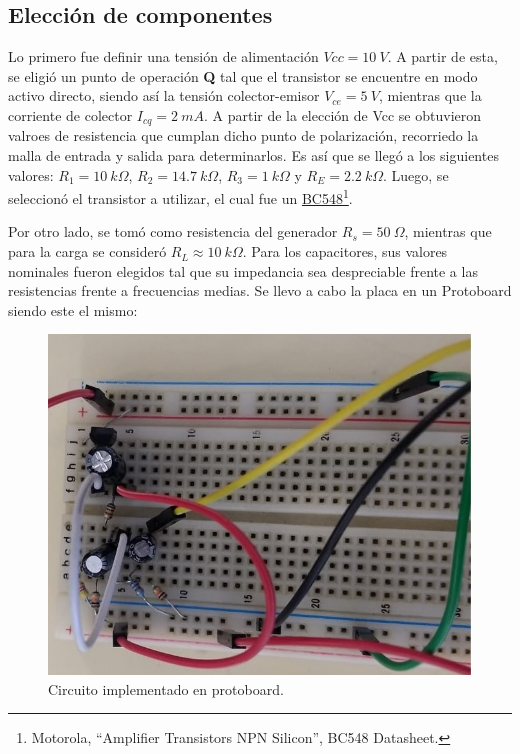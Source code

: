 \subsection{Elección de componentes}

Lo primero fue definir una tensión de alimentación $Vcc = 10 \ V$. A partir de esta, se eligió un punto de operación \textbf{Q} tal que el transistor se encuentre en modo activo directo, siendo así la tensión colector-emisor $V_{ce} = 5 \ V$, mientras que la corriente de colector $I_{cq} = 2 \ mA$.  A partir de la elección de Vcc se obtuvieron valroes de resistencia que cumplan dicho punto de polarización, recorriedo la malla de entrada y salida para determinarlos. Es así que se llegó a los siguientes valores: $R_1 = 10 \ k\Omega$, $R_2 = 14.7 \ k\Omega$, $R_3 = 1 \ k\Omega$ y $R_E = 2.2 \ k\Omega$. Luego, se seleccionó el transistor a utilizar, el cual fue un \href{https://www.futurlec.com/Transistors/BC548.shtml}{BC548}\footnote{Motorola, ``Amplifier Transistors NPN Silicon'', BC548 Datasheet.}.

Por otro lado, se tomó como resistencia del generador $R_s = 50 \ \Omega$, mientras que para la carga se consideró $R_L \approx 10 \ k\Omega$. Para los capacitores, sus valores nominales fueron elegidos tal que su impedancia sea despreciable frente a las resistencias frente a frecuencias medias.
Se llevo a cabo la placa en un Protoboard siendo este el mismo:
\begin{figure}[H]
\centering
\includegraphics[scale=0.6]{imagenes/proto.jpeg} 
\caption{Circuito implementado en protoboard.}
\end{figure}


